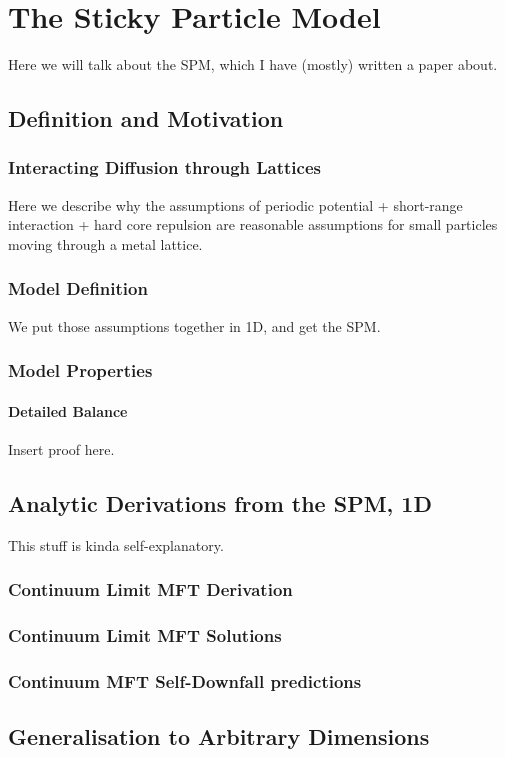 \chapter{The Sticky Particle Model}
Here we will talk about the SPM, which I have (mostly) written a paper about.


\section{Definition and Motivation}

\subsection{Interacting Diffusion through Lattices}
Here we describe why the assumptions of periodic potential + short-range interaction + hard core repulsion are reasonable assumptions for small particles moving through a metal lattice.
\subsection{Model Definition}
We put those assumptions together in 1D, and get the SPM.
\subsection{Model Properties}
\subsubsection{Detailed Balance}
Insert proof here.

\section{Analytic Derivations from the SPM, 1D}
This stuff is kinda self-explanatory.
\subsection{Continuum Limit MFT Derivation}
\subsection{Continuum Limit MFT Solutions}
\subsection{Continuum MFT Self-Downfall predictions}

\section{Generalisation to Arbitrary Dimensions}

